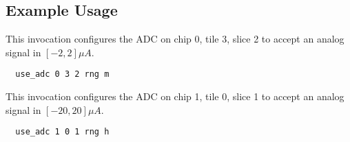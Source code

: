 \subsection{Example Usage}

This invocation configures the ADC on chip 0, tile 3, slice 2 to accept an
analog signal in $[-2,2] \mu A$.

\begin{lstlisting}
  use_adc 0 3 2 rng m 
\end{lstlisting}


This invocation configures the ADC on chip 1, tile 0, slice 1 to accept an
analog signal in $[-20,20] \mu A$.

\begin{lstlisting}
  use_adc 1 0 1 rng h
\end{lstlisting}